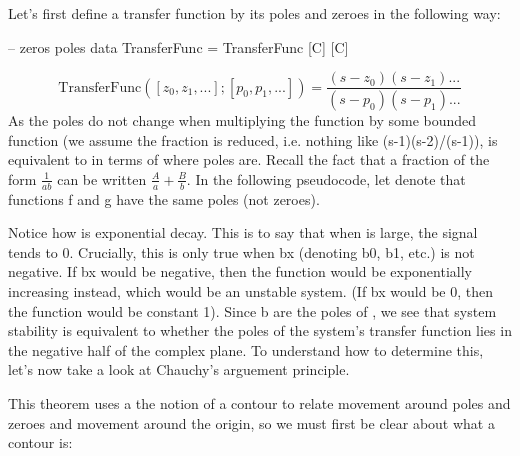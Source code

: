 \begin{newtext}
Let's first define a transfer function by its poles and zeroes in the following way:
\begin{code}
--                             zeros poles
data TransferFunc = TransferFunc [C] [C]
\end{code}
\begin{equation*}
    \text{TransferFunc}([z_0,z_1,...]; [p_0,p_1,...])=\frac{(s-z_0)(s-z_1)...}{(s-p_0)(s-p_1)...}
\end{equation*}
\LNContinue
As the poles do not change when multiplying the function by some bounded function (we assume the fraction is reduced, i.e. nothing like (s-1)(s-2)/(s-1)),  is equivalent to  in terms of where poles are. Recall the fact that a fraction of the form $\frac{1}{ab}$ can be written $\frac{A}{a}+\frac{B}{b}$. %
In the following pseudocode, let  denote that functions f and g have the same poles (not zeroes).

Notice how  is exponential decay. This is to say that when  is large, the signal tends to 0. Crucially, this is only true when bx (denoting b0, b1, etc.) is not negative. If bx would be negative, then the function would be exponentially increasing instead, which would be an unstable system. (If bx would be 0, then the function would be constant 1). Since b are the poles of , we see that system stability is equivalent to whether the poles of the system's transfer function lies in the negative half of the complex plane. To understand how to determine this, let's now take a look at Chauchy's arguement principle.



This theorem uses a the notion of a contour to relate movement around poles and zeroes and movement around the origin, so we must first be clear about what a contour is: 


\end{newtext}
